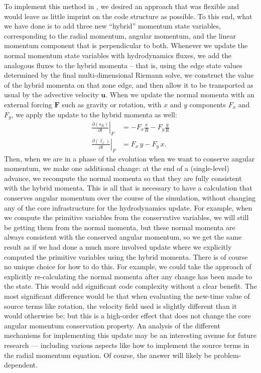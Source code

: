 \documentclass[12pt]{article}
\begin{document}
To implement this method in \castro, we desired an approach that was flexible
and would leave as little imprint on the code structure as possible.
To this end, what we have done is to add three new ``hybrid'' momentum state
variables, corresponding to the radial momentum, angular momentum, and the linear
momentum component that is perpendicular to both. Whenever we update the normal
momentum state variables with hydrodynamics fluxes, we add the analogous fluxes
to the hybrid momenta -- that is, using the edge state values determined by the
final multi-dimensional Riemann solve, we construct the value of the hybrid
momenta on that zone edge, and then allow it to be transported as usual by the
advective velocity $\mathbf{u}$. When we update the normal momenta with an
external forcing $\mathbf{F}$ such as gravity or rotation, with $x$ and $y$
components $F_x$ and $F_y$, we apply the update to the hybrid momenta as well:
\begin{align}
  \left.\frac{\partial(s_R)}{\partial t}\right|_{F} &= -F_x \frac{x}{R} - F_y\frac{y}{R} \label{eq:force-radial}\\
  \left.\frac{\partial(\ell_z)}{\partial t}\right|_{F} &= F_x\, y - F_y\, x.\label{eq:force-angular}
  \end{align}
Then, when we are in a phase of the evolution when we want to conserve angular
momentum, we make one additional change: at the end of a (single-level) advance,
we recompute the normal momenta so that they are fully consistent with the hybrid
momenta. This is all that is necessary to have a calculation that conserves angular
momentum over the course of the simulation, without changing any of the
core infrastructure for the hydrodynamics update. For example, when we compute
the primitive variables from the conservative variables, we will still be
getting them from the normal momenta, but these normal momenta are always consistent
with the conserved angular momentum, so we get the same result as if we had done
a much more involved update where we explicitly computed the primitive variables
using the hybrid momenta. There is of course no unique choice for how to do this.
For example, we could take the approach of explicitly re-calculating the normal
momenta after any change has been made to the state. This would add significant code
complexity without a clear benefit. The most significant difference would be
that when evaluating the new-time value of source terms like rotation, the velocity
field used is slightly different than it would otherwise be; but this is a high-order
effect that does not change the core angular momentum conservation property. An
analysis of the different mechanisms for implementing this update may be an interesting
avenue for future research --- including various aspects like how to implement the
source terms in the radial momentum equation. Of course, the answer will likely
be problem-dependent.
\end{document}
